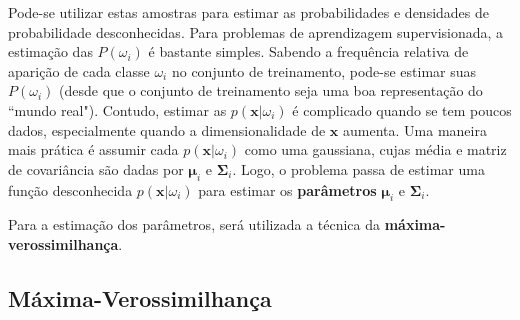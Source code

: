 \documentclass[a4paper,12pt,twocolumn]{article}
\begin{document}
Pode-se utilizar estas amostras para estimar as probabilidades e densidades de probabilidade desconhecidas. Para problemas de aprendizagem supervisionada, a estimação das $P(\omega_i)$ é bastante simples. Sabendo a frequência relativa de aparição de cada classe $\omega_i$ no conjunto de treinamento, pode-se estimar suas $P(\omega_i)$ (desde que o conjunto de treinamento seja uma boa representação do ``mundo real"). Contudo, estimar as $p(\boldsymbol{x}|\omega_i)$ é complicado quando se tem poucos dados, especialmente quando a dimensionalidade de $\boldsymbol{x}$ aumenta. Uma maneira mais prática é assumir cada $p(\boldsymbol{x}|\omega_i)$ como uma gaussiana, cujas média e matriz de covariância são dadas por $\boldsymbol{\mu}_i$ e $\boldsymbol{\Sigma}_i$. Logo, o problema passa de estimar uma função desconhecida $p(\boldsymbol{x}|\omega_i)$ para estimar os \textbf{parâmetros} $\boldsymbol{\mu}_i$ e $\boldsymbol{\Sigma}_i$.

Para a estimação dos parâmetros, será utilizada a técnica da \textbf{máxima-verossimilhança}.

\subsection{Máxima-Verossimilhança}
\end{document}
